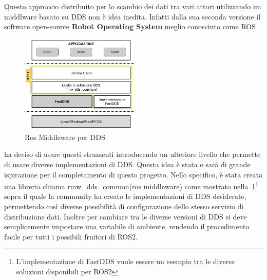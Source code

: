 Questo approccio distribuito per lo scambio dei dati tra vari attori utilizzando un middlware basato su DDS non è idea inedita. Infatti dalla sua seconda versione il software open-source \textbf{Robot Operating System}\cite{ros2iron} meglio conosciuto come ROS
\begin{figure}
  \includegraphics[width=0.5\textwidth]{img/ROS_MW.png}
  \caption{Ros Middleware per DDS} 
  \label{fig:rmw_dds_common}
\end{figure}
ha deciso di usare questi strumenti introducendo un ulteriore livello che permette di usare diverse implementazioni di DDS. Questa idea è stata e sarà di grande ispirazione per il completamento di questo progetto.
Nello specifico, è stata creata una libreria chiama rmw\_dds\_common(ros middleware) come mostrato nella~\ref{fig:rmw_dds_common}\footnote{L'implementazione di FastDDS vuole essere un esempio tra le diverse soluzioni disponibili per ROS2} sopra il quale la community ha creato le implementazioni di DDS desiderate, permettendo così diverse possibilità di configurazione dello stesso servizio di distribuzione dati.
Inoltre per cambiare tra le diverse versioni di DDS si deve semplicemente impostare una variabile di ambiente, rendendo il procedimento facile per tutti i possibili fruitori di ROS2. 

